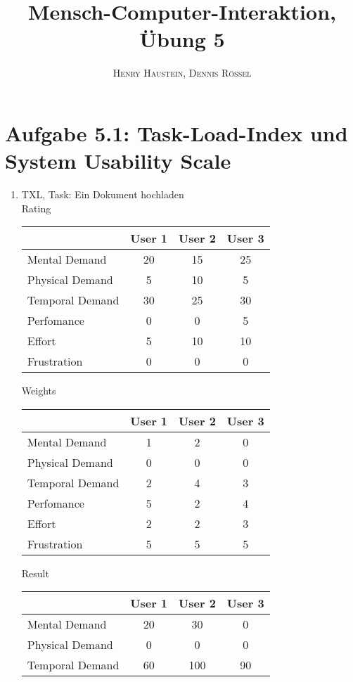 \documentclass{article}
\title{\textbf{Mensch-Computer-Interaktion, Übung 5}}
\author{\textsc{Henry Haustein}, \textsc{Dennis Rössel}}
\date{}
\begin{document}
	\maketitle
	
	\section*{Aufgabe 5.1: Task-Load-Index und System Usability Scale}
	\begin{enumerate}[label=(\alph*)]
		\item TXL, Task: Ein Dokument hochladen \\
		Rating
		\begin{center}
			\begin{tabular}{l|c|c|c}
				& \textbf{User 1} & \textbf{User 2} & \textbf{User 3} \\
				\hline
				Mental Demand & 20 & 15 & 25 \\
				Physical Demand & 5 & 10 & 5 \\
				Temporal Demand & 30 & 25 & 30 \\
				Perfomance & 0 & 0 & 5 \\
				Effort & 5 & 10 & 10 \\
				Frustration & 0 & 0 & 0
			\end{tabular}
		\end{center}
		Weights
		\begin{center}
			\begin{tabular}{l|c|c|c}
				& \textbf{User 1} & \textbf{User 2} & \textbf{User 3} \\
				\hline
				Mental Demand & 1 & 2 & 0 \\
				Physical Demand & 0 & 0 & 0 \\
				Temporal Demand & 2 & 4 & 3 \\
				Perfomance & 5 & 2 & 4 \\
				Effort & 2 & 2 & 3 \\
				Frustration & 5 & 5 & 5
			\end{tabular}
		\end{center}
		Result
		\begin{center}
			\begin{tabular}{l|c|c|c}
				& \textbf{User 1} & \textbf{User 2} & \textbf{User 3} \\
				\hline
				Mental Demand & 20 & 30 & 0 \\
				Physical Demand & 0 & 0 & 0 \\
				Temporal Demand & 60 & 100 & 90 \\

\end{tabular}
\end{center}
\end{enumerate}
\end{document}
